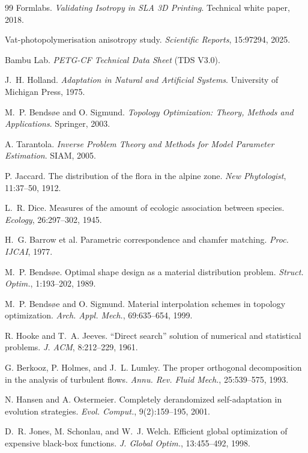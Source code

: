 \documentclass[11pt,a4paper]{article}
\begin{document}
\begin{thebibliography}{99}
 Formlabs. \textit{Validating Isotropy in SLA 3D Printing}.
Technical white paper, 2018.

 Vat-photopolymerisation anisotropy study.
\textit{Scientific Reports}, 15:97294, 2025.

 Bambu Lab. \textit{PETG-CF Technical Data Sheet} (TDS V3.0).

 J.~H. Holland. \textit{Adaptation in Natural and Artificial
Systems}. University of Michigan Press, 1975.

 M.~P. Bends\o{}e and O. Sigmund. \textit{Topology
Optimization: Theory, Methods and Applications}. Springer, 2003.

 A. Tarantola. \textit{Inverse Problem Theory and Methods
for Model Parameter Estimation}. SIAM, 2005.

 P. Jaccard. The distribution of the flora in the alpine
zone. \textit{New Phytologist}, 11:37--50, 1912.

 L.~R. Dice. Measures of the amount of ecologic association
between species. \textit{Ecology}, 26:297--302, 1945.

 H.~G. Barrow et al. Parametric correspondence and chamfer
matching. \textit{Proc. IJCAI}, 1977.

 M.~P. Bends\o{}e. Optimal shape design as a material
distribution problem. \textit{Struct. Optim.}, 1:193--202, 1989.

 M.~P. Bends\o{}e and O. Sigmund. Material interpolation
schemes in topology optimization. \textit{Arch. Appl. Mech.}, 69:635--654, 1999.

 R. Hooke and T.~A. Jeeves. ``Direct search'' solution of
numerical and statistical problems. \textit{J. ACM}, 8:212--229, 1961.

 G. Berkooz, P. Holmes, and J.~L. Lumley. The proper
orthogonal decomposition in the analysis of turbulent flows. \textit{Annu. Rev.
Fluid Mech.}, 25:539--575, 1993.

 N. Hansen and A. Ostermeier. Completely derandomized
self-adaptation in evolution strategies. \textit{Evol. Comput.}, 9(2):159--195,
2001.

 D.~R. Jones, M. Schonlau, and W.~J. Welch. Efficient global
optimization of expensive black-box functions. \textit{J. Global Optim.},
13:455--492, 1998.


\end{thebibliography}
\end{document}
